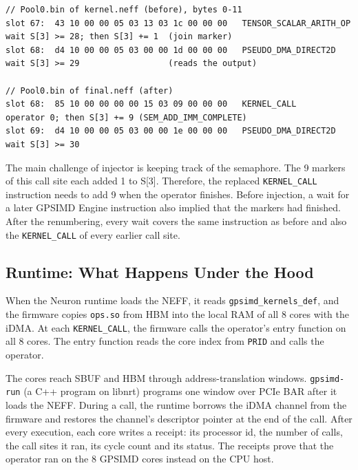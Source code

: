 \documentclass{article}
\newcommand{\code}[1]{\texttt{#1}}
\begin{document}
\begin{lstlisting}[basicstyle=\ttfamily\fontsize{6pt}{7pt}\selectfont]
// Pool0.bin of kernel.neff (before), bytes 0-11
slot 67:  43 10 00 00 05 03 13 03 1c 00 00 00   TENSOR_SCALAR_ARITH_OP  wait S[3] >= 28; then S[3] += 1  (join marker)
slot 68:  d4 10 00 00 05 03 00 00 1d 00 00 00   PSEUDO_DMA_DIRECT2D     wait S[3] >= 29                  (reads the output)

// Pool0.bin of final.neff (after)
slot 68:  85 10 00 00 00 00 15 03 09 00 00 00   KERNEL_CALL             operator 0; then S[3] += 9 (SEM_ADD_IMM_COMPLETE)
slot 69:  d4 10 00 00 05 03 00 00 1e 00 00 00   PSEUDO_DMA_DIRECT2D     wait S[3] >= 30
\end{lstlisting}

The main challenge of injector is keeping track of the semaphore. The 9 markers of this call site each added 1 to S[3]. Therefore, the replaced \code{KERNEL\_CALL} instruction needs to add 9 when the operator finishes. Before injection, a wait for a later GPSIMD Engine instruction also implied that the markers had finished. After the renumbering, every wait covers the same instruction as before and also the \code{KERNEL\_CALL} of every earlier call site.

\subsection{Runtime: What Happens Under the Hood}
\label{sec:runtime}

When the Neuron runtime loads the NEFF, it reads \code{gpsimd\_kernels\_def}, and the firmware copies \code{ops.so} from HBM into the local RAM of all 8 cores with the iDMA. At each \code{KERNEL\_CALL}, the firmware calls the operator's entry function on all 8 cores. The entry function reads the core index from \code{PRID} and calls the operator.

The cores reach SBUF and HBM through address-translation windows. \code{gpsimd-run} (a C++ program on libnrt) programs one window over PCIe BAR after it loads the NEFF. During a call, the runtime borrows the iDMA channel from the firmware and restores the channel's descriptor pointer at the end of the call. After every execution, each core writes a receipt: its processor id, the number of calls, the call sites it ran, its cycle count and its status. The receipts prove that the operator ran on the 8 GPSIMD cores instead on the CPU host.

\end{document}
